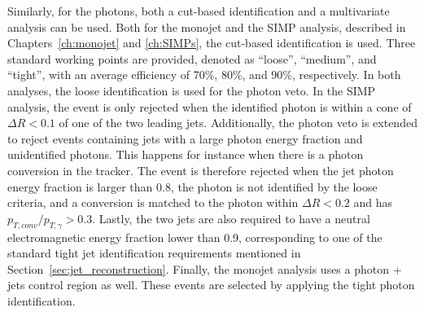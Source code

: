 Similarly, for the photons, both a cut-based identification and a multivariate analysis can be used. Both for the monojet and the \ac{SIMP} analysis, described in Chapters~\ref{ch:monojet} and \ref{ch:SIMPs}, the cut-based identification is used. Three standard working points are provided, denoted as ``loose'', ``medium'', and ``tight'', with an average efficiency of 70\%, 80\%, and 90\%, respectively. In both analyses, the loose identification is used for the photon veto. In the \ac{SIMP} analysis, the event is only rejected when the identified photon is within a cone of $\Delta R < 0.1$ of one of the two leading jets. Additionally, the photon veto is extended to reject events containing jets with a large photon energy fraction and unidentified photons. This happens for instance when there is a photon conversion in the tracker. The event is therefore rejected when the jet photon energy fraction is larger than 0.8, the photon is not identified by the loose criteria, and a conversion is matched to the photon within $\Delta R < 0.2$ and has $p_{T,conv} / p_{T,\gamma} > 0.3$. Lastly, the two jets are also required to have a neutral electromagnetic energy fraction lower than 0.9, corresponding to one of the standard tight jet identification requirements mentioned in Section~\ref{sec:jet_reconstruction}. Finally, the monojet analysis uses a photon + jets control region as well. These events are selected by applying the tight photon identification.


